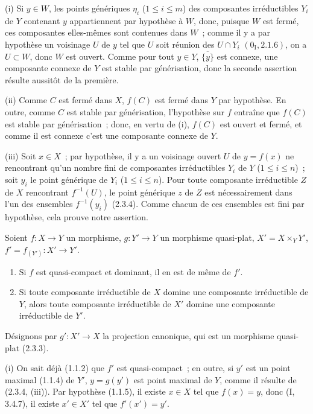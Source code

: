(i) Si $y\in W$, les points génériques $\eta_i$ ($1\leq i\leq m$) des
composantes irréductibles $Y_i$ de $Y$ contenant $y$ appartiennent par
hypothèse à $W$, donc, puisque $W$ est fermé, ces composantes elles-mêmes sont
contenues dans $W$~; comme il y a par hypothèse un voisinage $U$ de $y$ tel que
$U$ soit réunion des $U\cap Y_i$ $(0_{\mathrm I},2.1.6)$, on a
$U\subset W$, donc $W$ est ouvert. Comme pour tout $y\in Y$,
$\overline{\{y\}}$ est connexe, une composante connexe de $Y$ est stable par
générisation, donc la seconde assertion résulte aussitôt de la première.

(ii) Comme $C$ est fermé dans $X$, $f(C)$ est fermé dans $Y$ par hypothèse. En
outre, comme $C$ est stable par générisation, l'hypothèse sur $f$ entraîne que
$f(C)$ est stable par générisation~; donc, en vertu de (i), $f(C)$ est ouvert
et fermé, et comme il est connexe c'est une composante connexe de $Y$.

(iii) Soit $x\in X$~; par hypothèse, il y a un voisinage ouvert $U$ de
$y=f(x)$ ne rencontrant qu'un nombre fini de composantes irréductibles $Y_i$
de $Y$ ($1\leq i\leq n$)~; soit $y_i$ le point générique de $Y_i$
($1\leq i\leq n$). Pour toute composante irréductible $Z$ de $X$ rencontrant
$f^{-1}(U)$, le point générique $z$ de $Z$ est nécessairement dans l'un des
ensembles $f^{-1}(y_i)$ (2.3.4). Comme chacun de ces ensembles est fini par
hypothèse, cela prouve notre assertion.

\begin{proposition}[2.3.7]
\label{IV.2.3.7-fr}
Soient $f:X\to Y$ un morphisme, $g:Y'\to Y$ un morphisme quasi-plat,
$X'=X\times_Y Y'$, $f'=f_{(Y')}:X'\to Y'$.
\begin{enumerate}
  \item[(i)] Si $f$ est quasi-compact et dominant, il en est de même de $f'$.
  \item[(ii)] Si toute composante irréductible de $X$ domine une composante
  irréductible de $Y$, alors toute composante irréductible de $X'$ domine une
  composante irréductible de $Y'$.
\end{enumerate}
\end{proposition}

Désignons par $g':X'\to X$ la projection canonique, qui est un morphisme
quasi-plat (2.3.3).

(i) On sait déjà (1.1.2) que $f'$ est quasi-compact~; en outre, si $y'$ est un
point maximal (1.1.4) de $Y'$, $y=g(y')$ est point maximal de $Y$, comme il
résulte de (2.3.4, (iii)). Par hypothèse (1.1.5), il existe $x\in X$ tel que
$f(x)=y$, donc (I, 3.4.7), il existe $x'\in X'$ tel que $f'(x')=y'$.

